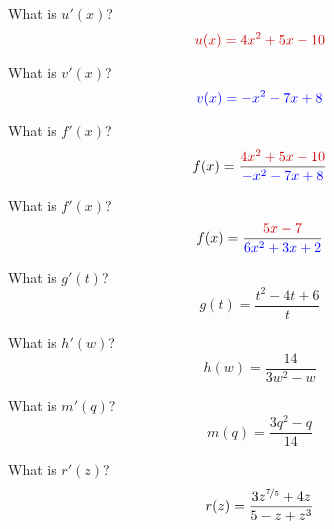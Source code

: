 
\begin{ProblemSet}[pencil space=2in]

 \begin{Problem}[pencil space=1in]
  What is $u'(x)$?
  \begin{equation*}
   \LeftStyle{u(x) = 4 x^2 + 5 x - 10}
  \end{equation*}
 \end{Problem}

 \begin{Problem}[pencil space=1in]
  What is $v'(x)$?
  \begin{equation*}
   \textcolor{blue}{v(x) = - x^2 - 7 x + 8}
  \end{equation*}
 \end{Problem}

 \begin{Problem}[pencil space=3in]
  What is $f'(x)$?
  \begin{equation*}
   f(x) = \frac{
    \LeftStyle{4 x^2 + 5 x - 10}
   }{
    \RightStyle{- x^2 - 7 x + 8}
   }
  \end{equation*}
 \end{Problem}

 \begin{Problem}[pencil space=3in]
  What is $f'(x)$?
  \begin{equation*}
   f(x) = \frac{
    \LeftStyle{5x - 7}
   }{
    \RightStyle{6 x^2 + 3 x + 2}
   }
  \end{equation*}
 \end{Problem}

 \begin{Problem}
  What is $g'(t)$?
  \begin{equation*}
   g(t) = \frac{t^2 - 4t + 6}{t}
  \end{equation*}
 \end{Problem}

 \begin{Problem}
  What is $h'(w)$?
  \begin{equation*}
   h(w) = \frac{14}{3w^2 - w}
  \end{equation*}
 \end{Problem}

 \begin{Problem}
  What is $m'(q)$?
  \begin{equation*}
   m(q) = \frac{3q^2 - q}{14}
  \end{equation*}
 \end{Problem}

 \begin{Problem}
  What is $r'(z)$?
  \begin{equation*}
   r(z) = \frac{3z^{\nicefrac{7}{5}} + 4z}{5 - z + z^3}
  \end{equation*}
 \end{Problem}

\end{ProblemSet}

